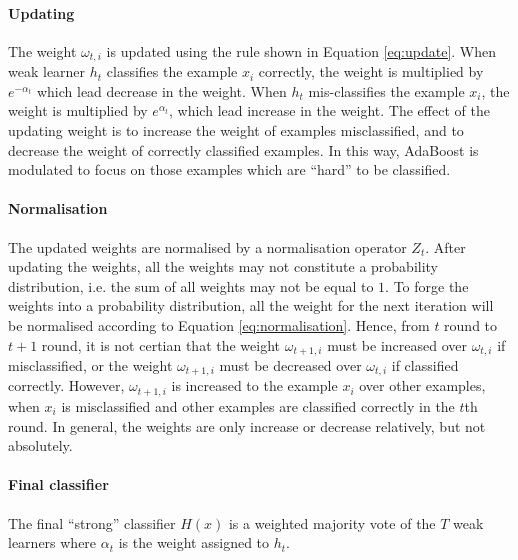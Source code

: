 \paragraph{Updating}The weight $\omega_{t,i}$ is updated using the rule shown in \mbox{Equation} \ref{eq:update}. When weak learner $h_{t}$ classifies the example $x_{i}$ correctly, the weight is multiplied by $e^{-\alpha_{t}}$ which lead decrease in the weight. When $h_{t}$ mis-classifies the example  $x_{i}$, the weight is multiplied by $e^{\alpha_{t}}$, which lead increase in the weight. The effect of the updating weight is to increase the weight of examples misclassified, and to decrease the weight of correctly classified examples. In this way, AdaBoost is modulated to focus on those examples which are ``hard'' to be classified.

\paragraph{Normalisation}The updated weights are normalised by a normalisation operator $Z_{t}$. After updating the weights, all the weights may not constitute a probability distribution, i.e. the sum of all weights may not be equal to $1$. To forge the weights into a probability distribution, all the weight for the next iteration will be normalised according to \mbox{Equation} \ref{eq:normalisation}.  Hence, from $t$ round to $t+1$ round, it is not certian that the weight $\omega_{t+1,i}$ must be increased over  $\omega_{t,i}$ if misclassified, or the weight  $\omega_{t+1,i}$ must be decreased over  $\omega_{t,i}$ if classified correctly. However,  $\omega_{t+1,i}$ is increased to the example $x_{i}$ over other examples, when $x_{i}$ is misclassified and other examples are classified correctly in the $t$th round. In general, the weights are only increase or decrease relatively, but not absolutely.

\paragraph{Final classifier}
The final ``strong'' classifier $H(x)$ is a weighted majority vote of the $T$ weak learners where $\alpha_{t}$ is the weight assigned to $h_{t}$.

